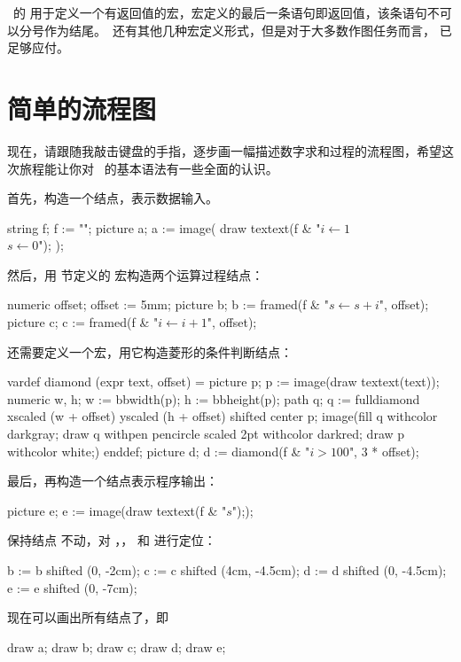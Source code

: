 \METAPOST\ 的  用于定义一个有返回值的宏，宏定义的最后一条语句即返回值，该条语句不可以分号作为结尾。\METAPOST\ 还有其他几种宏定义形式，但是对于大多数作图任务而言， 已足够应付。

\section[sec:flow-chart]{简单的流程图}

现在，请跟随我敲击键盘的手指，逐步画一幅描述数字求和过程的流程图，希望这次旅程能让你对 \METAPOST\ 的基本语法有一些全面的认识。

首先，构造一个结点，表示数据输入。

\starttyping[option=MP]
string f; f := "\framed[frame=off,align=center]";
picture a;
a := image(
  draw textext(f & "{$i\leftarrow 1$\\$s\leftarrow 0$}");
);
\stoptyping

然后，用 \in[macro] 节定义的  宏构造两个运算过程结点：

\starttyping[option=MP]
numeric offset; offset := 5mm;
picture b; b := framed(f & "{$s\leftarrow s + i$}", offset);
picture c; c := framed(f & "{$i\leftarrow i + 1$}", offset);
\stoptyping

还需要定义一个宏，用它构造菱形的条件判断结点：

\starttyping[option=MP]
vardef diamond (expr text, offset) =
  picture p; p := image(draw textext(text));
  numeric w, h; w := bbwidth(p); h := bbheight(p);
  path q;
  q := fulldiamond xscaled (w + offset) yscaled (h + offset) shifted center p;
  image(fill q withcolor darkgray;
        draw q withpen pencircle scaled 2pt withcolor darkred;
        draw p withcolor white;)
enddef;
picture d; d := diamond(f & "{$i > 100$}", 3 * offset);
\stoptyping

最后，再构造一个结点表示程序输出：

\starttyping[option=MP]
picture e;
e := image(draw textext(f & "{$s$}"););
\stoptyping

保持结点  不动，对 ，， 和  进行定位：

\starttyping[option=MP]
b := b shifted (0, -2cm);
c := c shifted (4cm, -4.5cm);
d := d shifted (0, -4.5cm);
e := e shifted (0, -7cm);
\stoptyping

现在可以画出所有结点了，即

\starttyping[option=MP]
draw a; draw b; draw c; draw d; draw e;
\stoptyping
{}
\blank

